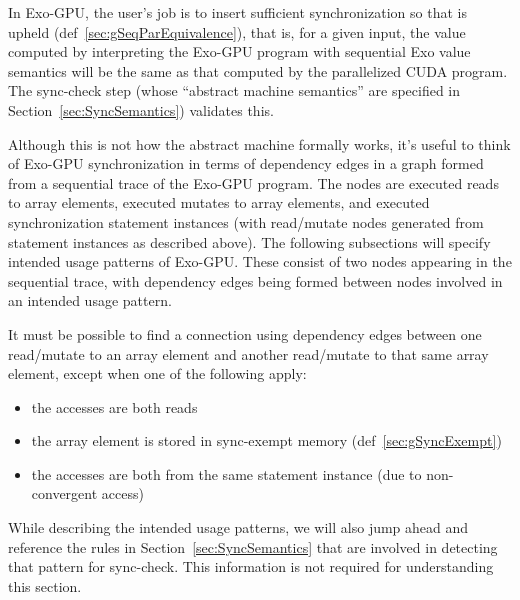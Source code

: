 In Exo-GPU, the user's job is to insert sufficient synchronization so that  is upheld (def~\ref{sec:gSeqParEquivalence}), that is, for a given input, the value computed by interpreting the Exo-GPU program with sequential Exo value semantics will be the same as that computed by the parallelized CUDA program.
The sync-check step (whose ``abstract machine semantics'' are specified in Section~\ref{sec:SyncSemantics}) validates this.

Although this is not how the abstract machine formally works, it's useful to think of Exo-GPU synchronization in terms of dependency edges in a graph formed from a sequential trace of the Exo-GPU program.
The nodes are executed reads to array elements, executed mutates to array elements, and executed synchronization statement instances (with read/mutate nodes generated from statement instances as described above).
The following subsections will specify intended usage patterns of Exo-GPU.
These consist of two nodes appearing in the sequential trace, with dependency edges being formed between nodes involved in an intended usage pattern.

It must be possible to find a connection using dependency edges between one read/mutate to an array element and another read/mutate to that same array element, except when one of the following apply:
\begin{itemize}
    \item the accesses are both reads
    \item the array element is stored in sync-exempt memory (def~\ref{sec:gSyncExempt})
    \item the accesses are both from the same statement instance (due to non-convergent access)
\end{itemize}
While describing the intended usage patterns, we will also jump ahead and reference the rules in Section~\ref{sec:SyncSemantics} that are involved in detecting that pattern for sync-check.
This information is not required for understanding this section.














